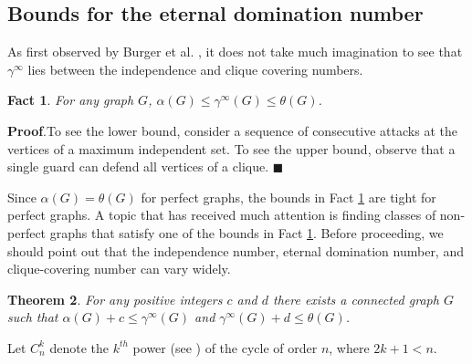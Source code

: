 \documentclass[12pt]{article}%
\newtheorem{theorem}{Theorem}[section]
\newtheorem{Fact}[theorem]{Fact}
\begin{document}
\subsection{Bounds for the eternal domination number\label{Sec_Bounds}}

As first observed by Burger et al. \cite{BCG2}, it does not take much
imagination to see that $\gamma^{\infty}$ lies between the independence and
clique covering numbers.

\begin{Fact}
\label{FactED_Bound}For any graph $G$, $\alpha(G)\leq\gamma^{\infty}%
(G)\leq\theta(G)$.
\end{Fact}

\noindent\textbf{Proof}.\hspace{0.1in}To see the lower bound, consider a
sequence of consecutive attacks at the vertices of a maximum independent set.
To see the upper bound, observe that a single guard can defend all vertices of
a clique. \hfill$\blacksquare$

\bigskip

Since $\alpha(G)=\theta(G)$ for perfect graphs, the bounds in Fact
\ref{FactED_Bound} are tight for perfect graphs. A topic that has received
much attention is finding classes of non-perfect graphs that satisfy one of
the bounds in Fact \ref{FactED_Bound}. Before proceeding, we should point out
that the independence number, eternal domination number, and clique-covering
number can vary widely.

\begin{theorem}
\label{ThmDifference}\emph{\cite{KM2}}\hspace{0.1in}For any positive integers
$c$ and $d$ there exists a connected graph $G$ such that $\alpha
(G)+c\leq\gamma^{\infty}(G)$ and $\gamma^{\infty}(G)+d\leq\theta(G)$.
\end{theorem}

Let $C_{n}^{k}$ denote the $k^{th}$ power (see \cite[p. 105]{CL}) of the cycle
of order $n$, where $2k+1<n$.
\end{document}
